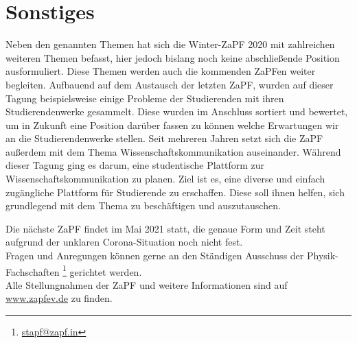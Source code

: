 \section*{Sonstiges}

Neben den genannten Themen hat sich die Winter-ZaPF 2020 mit zahlreichen weiteren Themen befasst, hier jedoch bislang noch keine abschließende Position ausformuliert. Diese Themen werden auch die kommenden ZaPFen weiter begleiten. Aufbauend auf dem Austausch der letzten ZaPF, wurden auf dieser Tagung beispielsweise einige Probleme der Studierenden mit ihren Studierendenwerke gesammelt. Diese wurden im Anschluss sortiert und bewertet, um in Zukunft eine Position darüber fassen zu können welche Erwartungen wir an die Studierendenwerke stellen. Seit mehreren Jahren setzt sich die ZaPF außerdem mit dem Thema Wissenschaftskommunikation auseinander. Während dieser Tagung ging es darum, eine studentische Plattform zur Wissenschaftskommunikation zu planen. Ziel ist es, eine diverse und einfach zugängliche Plattform für Studierende zu erschaffen. Diese soll ihnen helfen, sich grundlegend mit dem Thema zu beschäftigen und auszutauschen.

Die nächste ZaPF findet im Mai 2021 statt, die genaue Form und Zeit steht aufgrund der unklaren Corona-Situation noch nicht fest. \\
Fragen und Anregungen können gerne an den Ständigen Ausschuss der Physik-Fachschaften \footnote{\url{stapf@zapf.in}} gerichtet werden.\\
Alle Stellungnahmen der ZaPF und weitere Informationen sind auf \url{www.zapfev.de} zu finden.
